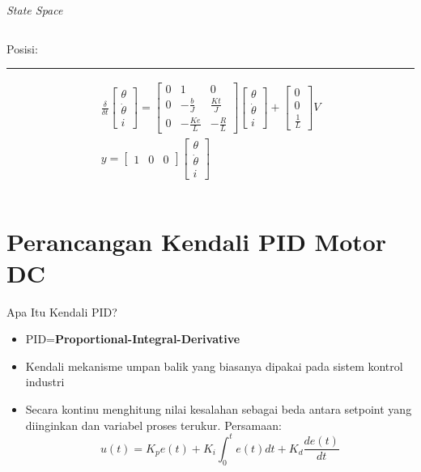 \documentclass[10pt,xcolor={dvipsnames}]{beamer}
\begin{document}
\begin{frame}{\textit{State Space}}
\begin{columns}[T]
\begin{column}{0.5\textwidth}
			Posisi:\newline
			\color{myNewColorA}\rule{\linewidth}{4pt}
			\begin{equation}
				\begin{split}
					\frac{\delta}{\delta t}
					\begin{bmatrix}
						\theta \\ \dot{\theta} \\ i
					\end{bmatrix}
					=
					\begin{bmatrix}
						0 & 1 & 0\\
						0 & -\frac{b}{J} & \frac{Kt}{J}\\
						0 & -\frac{Ke}{L} & -\frac{R}{L}
					\end{bmatrix}
					\begin{bmatrix}
						\theta \\ \dot{\theta} \\ i
					\end{bmatrix}
					+
					\begin{bmatrix}
						0 \\ 0 \\ \frac{1}{L}
					\end{bmatrix}
					V\\
					y=
					\begin{bmatrix}
						1 & 0 & 0
					\end{bmatrix}
					\begin{bmatrix}
						\theta \\ \dot{\theta} \\ i
					\end{bmatrix}
				\end{split}
			\end{equation}
		\end{column}
	\end{columns}
\end{frame}

\section{Perancangan Kendali PID Motor DC}
\begin{frame}{Apa Itu Kendali PID?}
	\begin{itemize}
		\item PID=\textbf{Proportional-Integral-Derivative}
		\item Kendali mekanisme umpan balik yang biasanya dipakai pada sistem kontrol industri
		\item Secara kontinu menghitung nilai kesalahan sebagai beda antara setpoint yang diinginkan dan variabel proses terukur.
		Persamaan:
		\begin{equation}
			u(t)=K_{p}e(t)+K_{i}\int_{0}^{t}e(t)dt+K_{d}\frac{de(t)}{dt}
		\end{equation}
	\end{itemize}
\end{frame}
\end{document}
